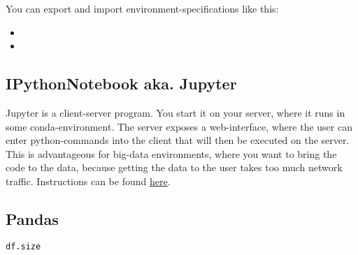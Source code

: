 You can export and import environment-specifications like this: 
\begin{itemize}
	\item {}
	\item {}
\end{itemize}


\subsection{IPythonNotebook aka. Jupyter}
Jupyter is a client-server program. You start it on your server, where it runs in some conda-environment. 
The server exposes a web-interface, where the user can enter python-commands into the client that will then be executed on the server. 
This is advantageous for big-data environments, where you want to bring the code to the data, because getting the data to the user takes too much network traffic. 
Instructions can be found \href{https://jupyter-notebook.readthedocs.io/en/stable/public_server.html}{here}.


\subsection{Pandas}
\begin{lstlisting}[language=python]
df.size
\end{lstlisting}